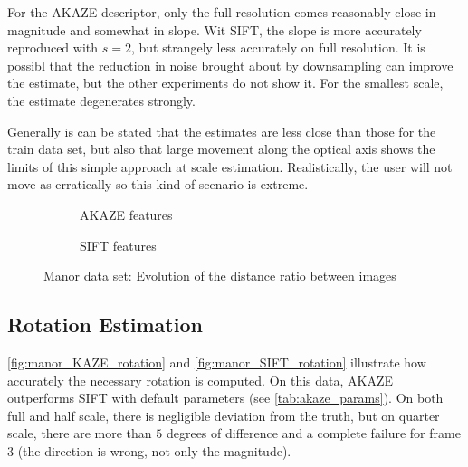 For the AKAZE descriptor, only the full resolution comes reasonably close in
magnitude and somewhat in slope. Wit SIFT, the slope is more accurately
reproduced with $s=2$, but strangely less accurately on full resolution. It is
possibl that the reduction in noise brought about by downsampling can improve
the estimate, but the other experiments do not show it. For the
smallest scale, the estimate degenerates strongly.

Generally is can be stated that the estimates are less close than those for the
train data set, but also that large movement along the optical axis shows the
limits of this simple approach at scale estimation. Realistically, the user will
not move as erratically so this kind of scenario is extreme.

\begin{figure}
   \begin{subfigure}[b]{.5\linewidth}
      \centering      
      
      \caption{AKAZE features}
      \label{fig:manor_KAZE_dist_ratio}
   \end{subfigure}
   \quad\begin{subfigure}[b]{.5\linewidth}
      \centering      
      
      \caption{SIFT features}
      \label{fig:manor_SIFT_dist_ratio}
   \end{subfigure}
   \caption[Manor Data: distance ratio]{Manor data set: Evolution of the distance ratio between images}
   \label{fig:manor_dist_ratio}
\end{figure}

\subsection{Rotation Estimation}

\autoref{fig:manor_KAZE_rotation} and \autoref{fig:manor_SIFT_rotation}
illustrate how accurately the necessary rotation is computed. On this data, AKAZE
outperforms SIFT with default parameters (see \autoref{tab:akaze_params}). On both full and
half scale, there is negligible deviation from the truth, but on quarter scale,
there are more than $5$ degrees of difference and a complete failure for frame
$3$ (the direction is wrong, not only the magnitude).

